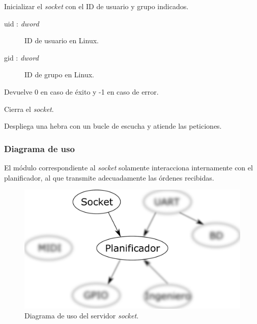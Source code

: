\begin{description}[style=nextline]
	\item[socket\_init (uid, gid) : \textit{dword}]
	Inicializar el \textit{socket} con el ID de usuario y grupo indicados.
	
	\begin{description}
		\item[uid : \textit{dword}] ID de usuario en Linux.
		\item[gid : \textit{dword}] ID de grupo en Linux.
	\end{description}
	
	Devuelve 0 en caso de éxito y -1 en caso de error.
	
	\item[socket\_destroy ()]
	Cierra el \textit{socket}.
	
	\item[socket\_loop ()]
	Despliega una hebra con un bucle de escucha y atiende las peticiones.
	
\end{description}

\subsubsection{Diagrama de uso}

El módulo correspondiente al \textit{socket} solamente interacciona internamente con el planificador, al que transmite adecuadamente las órdenes recibidas.

\smallskip

\begin{figure}[H]
	\noindent \begin{centering}
		\includegraphics[width=\linewidth/2]{capitulo4/daemon_socket}
		\par\end{centering}
	\smallskip
	\caption{\label{fig:daemon_socket} Diagrama de uso del servidor \textit{socket}.}
\end{figure} 

